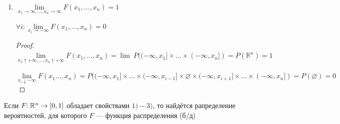 \begin{enumerate}
    \begin{definition}
    Последовательность $x^k$ (в данном случае $k$ --- верхний индекс) стремится к $x$ справа ($x^k \downarrow x$), если $\forall k : x^{k+1} \leqslant x^k$ и $x = \lim\limits_{k \to \infty} x^k$
    \end{definition}
    
    Теперь к самому свойству: $\forall x^k \downarrow x \ \!\! : \lim\limits_{k \to \infty} F(x^k) = F(x)$
    
    \begin{proof}
    \[\lim\limits_{k \to \infty}F(x^k) = \lim\limits_{k \to \infty}  P((-\infty, x_1^k] \times \ldots \times(-\infty, x_n^k]) = P\left(\bigcap\limits_{k} (-\infty, x_1^k] \times \ldots \times(-\infty, x_n^k])\right) =\]
    \[= P((-\infty, x_1] \times \ldots \times(-\infty, x_n]) = F(x)\]
    \end{proof}
    
    \item $\lim\limits_{x_1 \to \infty, \ldots, x_n \to \infty} F(x_1, \ldots, x_n) = 1$
    
    $\forall i : \lim\limits_{x_i \to -\infty} F(x_1, \ldots, x_n) = 0$
    
    \begin{proof}
    $\lim\limits_{x_1 \uparrow +\infty, \ldots, x_n \uparrow +\infty} F(x_1, \ldots, x_n) = \lim \ P((-\infty, x_1] \times \ldots \times(-\infty, x_n]) = P(\mathbb{R}^n) = 1$
    
    $\lim\limits_{x_i \downarrow -\infty}\!\! F(x_1\ldots, x_n) \!=\! P((-\infty, x_1] \!\times \ldots \times\! (-\infty, x_{i-1}] \!\times\! \varnothing \!\times\! (-\infty, x_{i+1}] \times \ldots \times (-\infty, x_n]) \!=\! P(\varnothing) \!=\! 0$
    \end{proof}
\end{enumerate}

\begin{theorem}
Если $F\!\!: \mathbb{R}^n \to [0, 1]$ обладает свойствами $1)-3)$, то найдётся рапределение вероятностей, для которого $F$ --- функция распределения (б/д)
\end{theorem}
